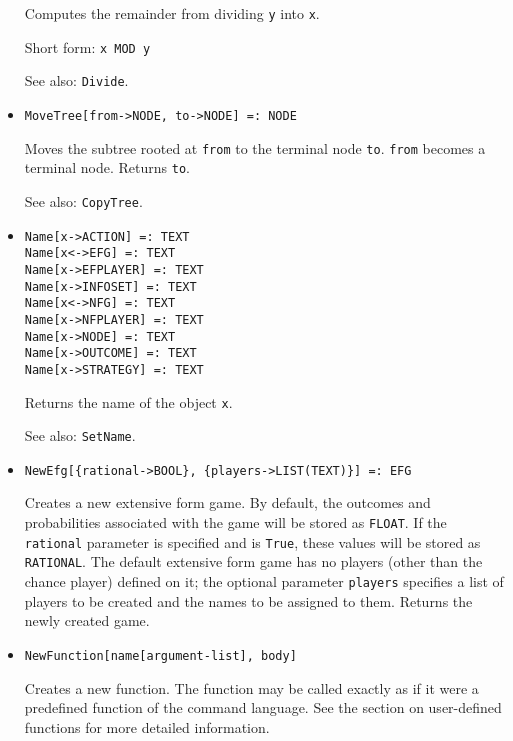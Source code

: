\begin{itemize}
\bd
Computes the remainder from dividing \verb+y+ into \verb+x+.
\item
[Short form:] \verb+x MOD y+
\item
[See also:] {\tt Divide}.
\ed


\item
\protect \large \begin{verbatim}
MoveTree[from->NODE, to->NODE] =: NODE
\end{verbatim}\normalsize

\bd
Moves the subtree rooted at \verb+from+ to
the terminal node \verb+to+.  \verb+from+ becomes a terminal node.
Returns \verb+to+.
\item
[See also:] {\tt CopyTree}.
\ed


\item
\protect \large \begin{verbatim}
Name[x->ACTION] =: TEXT
Name[x<->EFG] =: TEXT
Name[x->EFPLAYER] =: TEXT
Name[x->INFOSET] =: TEXT
Name[x<->NFG] =: TEXT
Name[x->NFPLAYER] =: TEXT
Name[x->NODE] =: TEXT
Name[x->OUTCOME] =: TEXT
Name[x->STRATEGY] =: TEXT
\end{verbatim}\normalsize

\bd
Returns the name of the object \verb+x+.
\item
[See also:] {\tt SetName}.
\ed

\item
\protect \large \begin{verbatim} 
NewEfg[{rational->BOOL}, {players->LIST(TEXT)}] =: EFG
\end{verbatim}\normalsize

\bd
Creates a new extensive form game.  By default, the
outcomes and probabilities associated with the game will be stored as
{\tt FLOAT}.  If the \verb+rational+ parameter is specified and is \verb+True+,
these values will be stored as {\tt RATIONAL}.  The default extensive form
game has no players (other than the chance player) defined on it; the
optional parameter \verb+players+ specifies a list of players to be
created and the names to be assigned to them.  Returns the newly created
game.
\ed

\item   
\protect \large \begin{verbatim}
NewFunction[name[argument-list], body]
\end{verbatim}\normalsize

\bd
Creates a new function.  The function may be called exactly
as if it were a predefined function of the command language.  See the
section on user-defined functions for more detailed information.
\ed


\end{itemize}
